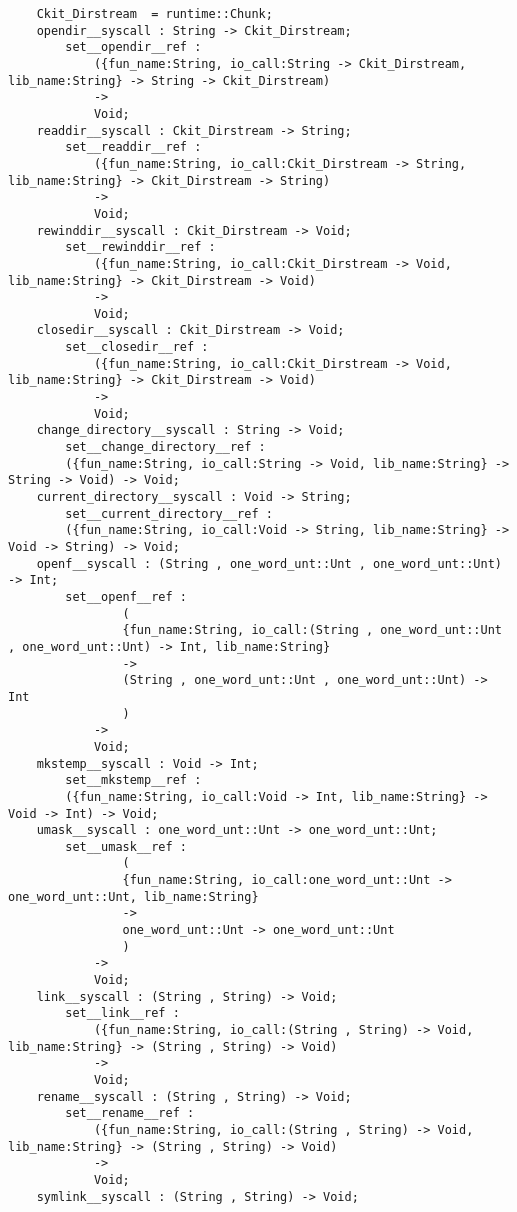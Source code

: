 \begin{verbatim}
    Ckit_Dirstream  = runtime::Chunk;
    opendir__syscall : String -> Ckit_Dirstream;
        set__opendir__ref :
            ({fun_name:String, io_call:String -> Ckit_Dirstream, lib_name:String} -> String -> Ckit_Dirstream)
            ->
            Void;
    readdir__syscall : Ckit_Dirstream -> String;
        set__readdir__ref :
            ({fun_name:String, io_call:Ckit_Dirstream -> String, lib_name:String} -> Ckit_Dirstream -> String)
            ->
            Void;
    rewinddir__syscall : Ckit_Dirstream -> Void;
        set__rewinddir__ref :
            ({fun_name:String, io_call:Ckit_Dirstream -> Void, lib_name:String} -> Ckit_Dirstream -> Void)
            ->
            Void;
    closedir__syscall : Ckit_Dirstream -> Void;
        set__closedir__ref :
            ({fun_name:String, io_call:Ckit_Dirstream -> Void, lib_name:String} -> Ckit_Dirstream -> Void)
            ->
            Void;
    change_directory__syscall : String -> Void;
        set__change_directory__ref :
        ({fun_name:String, io_call:String -> Void, lib_name:String} -> String -> Void) -> Void;
    current_directory__syscall : Void -> String;
        set__current_directory__ref :
        ({fun_name:String, io_call:Void -> String, lib_name:String} -> Void -> String) -> Void;
    openf__syscall : (String , one_word_unt::Unt , one_word_unt::Unt) -> Int;
        set__openf__ref :
                (
                {fun_name:String, io_call:(String , one_word_unt::Unt , one_word_unt::Unt) -> Int, lib_name:String}
                ->
                (String , one_word_unt::Unt , one_word_unt::Unt) -> Int
                )
            ->
            Void;
    mkstemp__syscall : Void -> Int;
        set__mkstemp__ref :
        ({fun_name:String, io_call:Void -> Int, lib_name:String} -> Void -> Int) -> Void;
    umask__syscall : one_word_unt::Unt -> one_word_unt::Unt;
        set__umask__ref :
                (
                {fun_name:String, io_call:one_word_unt::Unt -> one_word_unt::Unt, lib_name:String}
                ->
                one_word_unt::Unt -> one_word_unt::Unt
                )
            ->
            Void;
    link__syscall : (String , String) -> Void;
        set__link__ref :
            ({fun_name:String, io_call:(String , String) -> Void, lib_name:String} -> (String , String) -> Void)
            ->
            Void;
    rename__syscall : (String , String) -> Void;
        set__rename__ref :
            ({fun_name:String, io_call:(String , String) -> Void, lib_name:String} -> (String , String) -> Void)
            ->
            Void;
    symlink__syscall : (String , String) -> Void;

\end{verbatim}

